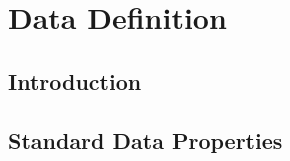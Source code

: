 \section{Data Definition}
\subsection{Introduction}
\subsection{Standard Data Properties}
\orgcishellframeworkdata{}
